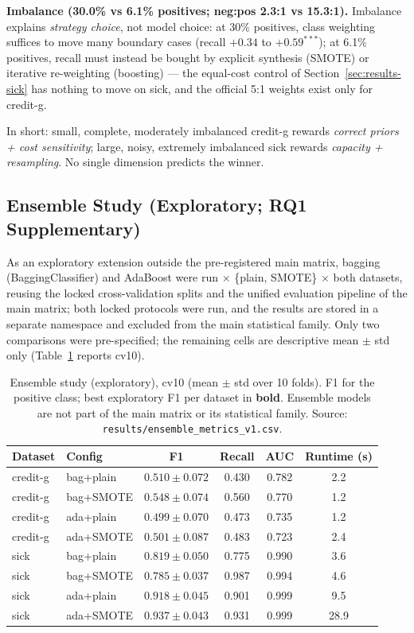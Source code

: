 \textbf{Imbalance (30.0\% vs 6.1\% positives; neg:pos 2.3:1 vs 15.3:1).} Imbalance explains \emph{strategy choice}, not model choice: at 30\% positives, class weighting suffices to move many boundary cases (recall $+0.34$ to $+0.59^{***}$); at 6.1\% positives, recall must instead be bought by explicit synthesis (SMOTE) or iterative re-weighting (boosting) --- the equal-cost control of Section~\ref{sec:results-sick} has nothing to move on sick, and the official 5:1 weights exist only for credit-g.

In short: small, complete, moderately imbalanced credit-g rewards \emph{correct priors + cost sensitivity}; large, noisy, extremely imbalanced sick rewards \emph{capacity + resampling}. No single dimension predicts the winner.

\subsection{Ensemble Study (Exploratory; RQ1 Supplementary)}
\label{sec:results-ensemble}

As an exploratory extension outside the pre-registered main matrix, bagging (BaggingClassifier) and AdaBoost were run $\times$ \{plain, SMOTE\} $\times$ both datasets, reusing the locked cross-validation splits and the unified evaluation pipeline of the main matrix; both locked protocols were run, and the results are stored in a separate namespace and excluded from the main statistical family. Only two comparisons were pre-specified; the remaining cells are descriptive mean $\pm$ std only (Table~\ref{tab:ensemble} reports cv10).

\begin{table}[H]
\centering
\caption{Ensemble study (exploratory), cv10 (mean $\pm$ std over 10 folds). F1 for the positive class; best exploratory F1 per dataset in \textbf{bold}. Ensemble models are not part of the main matrix or its statistical family. Source: \texttt{results/ensemble\_metrics\_v1.csv}.}
\label{tab:ensemble}
\begin{tabular}{llcccc}
\toprule
Dataset & Config & F1 & Recall & AUC & Runtime (s) \\
\midrule
credit-g & bag+plain & $0.510\pm0.072$ & 0.430 & 0.782 & 2.2 \\
credit-g & bag+SMOTE & $0.548\pm0.074$ & 0.560 & 0.770 & 1.2 \\
credit-g & ada+plain & $0.499\pm0.070$ & 0.473 & 0.735 & 1.2 \\
credit-g & ada+SMOTE & $0.501\pm0.087$ & 0.483 & 0.723 & 2.4 \\
\midrule
sick & bag+plain & $0.819\pm0.050$ & 0.775 & 0.990 & 3.6 \\
sick & bag+SMOTE & $0.785\pm0.037$ & 0.987 & 0.994 & 4.6 \\
sick & ada+plain & $0.918\pm0.045$ & 0.901 & 0.999 & 9.5 \\
sick & ada+SMOTE & $\mathbf{0.937\pm0.043}$ & 0.931 & 0.999 & 28.9 \\
\bottomrule
\end{tabular}
\end{table}

